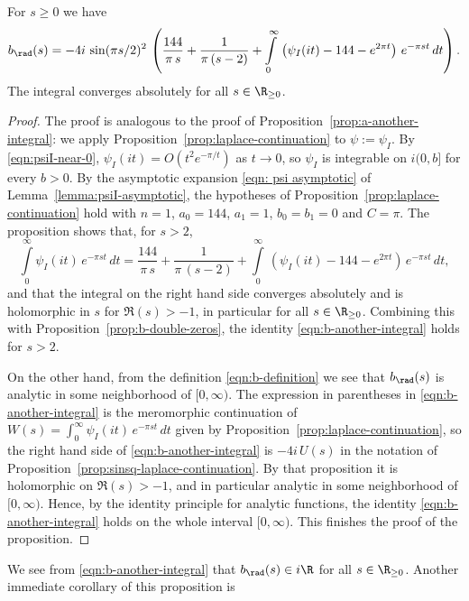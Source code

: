 \begin{proposition}\label{prop:b-another-integral}
For $s\geq0$ we have
\begin{equation}\label{eqn:b-another-integral}b_\rad(s)=-4i\,\sin(\pi s/2)^2\,\left(\frac{144}{\pi\,s}+\frac{1}{\pi\,(s-2)}+\int\limits_0^\infty\,\left(\psi_I(it)-144-e^{2\pi t}\right)\,e^{-\pi s t}\,dt\right).\end{equation}
The integral converges absolutely for all $s\in\R_{\geq 0}$.
\end{proposition}
\begin{proof}
The proof is analogous to the proof of Proposition~\ref{prop:a-another-integral}: we apply Proposition~\ref{prop:laplace-continuation} to $\psi := \psi_I$.
By \eqref{eqn:psiI-near-0}, $\psi_I(it) = O(t^2 e^{-\pi/t})$ as $t \to 0$, so $\psi_I$ is integrable on $i(0, b]$ for every $b > 0$.
By the asymptotic expansion \eqref{eqn: psi asymptotic} of Lemma~\ref{lemma:psiI-asymptotic}, the hypotheses of Proposition~\ref{prop:laplace-continuation} hold with $n = 1$, $a_0 = 144$, $a_1 = 1$, $b_0 = b_1 = 0$ and $C = \pi$. The proposition shows that, for $s > 2$,
\[
\int\limits_{0}^{\infty}\psi_I(it)\,e^{-\pi s t}\,dt
=\frac{144}{\pi\,s}+\frac{1}{\pi\,(s-2)}+\int\limits_0^\infty\,\left(\psi_I(it)-144-e^{2\pi t}\right)\,e^{-\pi s t}\,dt,
\]
and that the integral on the right hand side converges absolutely and is holomorphic in $s$ for $\Re(s) > -1$, in particular for all $s \in \R_{\geq 0}$.
Combining this with Proposition~\ref{prop:b-double-zeros}, the identity \eqref{eqn:b-another-integral} holds for $s>2$.

On the other hand, from the definition \eqref{eqn:b-definition} we see that $b_\rad(s)$ is analytic in some neighborhood of $[0,\infty)$.
The expression in parentheses in \eqref{eqn:b-another-integral} is the meromorphic continuation of $W(s) = \int_0^\infty \psi_I(it)\,e^{-\pi s t}\,dt$ given by Proposition~\ref{prop:laplace-continuation}, so the right hand side of \eqref{eqn:b-another-integral} is $-4i\,U(s)$ in the notation of Proposition~\ref{prop:sinsq-laplace-continuation}. By that proposition it is holomorphic on $\Re(s) > -1$, and in particular analytic in some neighborhood of $[0,\infty)$. Hence, by the identity principle for analytic functions, the identity \eqref{eqn:b-another-integral} holds on the whole interval $[0,\infty)$. This finishes the proof of the proposition.
\end{proof}
We see from \eqref{eqn:b-another-integral} that $b_\rad(s)\in i\R$ for all $s\in\R_{\geq0}$.
Another immediate corollary of this proposition is

